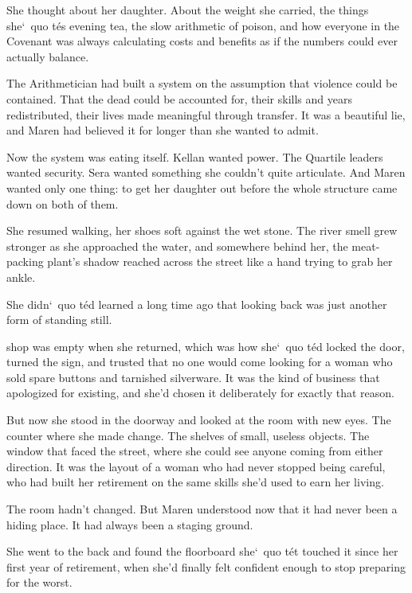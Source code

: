 \documentclass[12pt,letterpaper,openany]{book}
\begin{document}
\par
She thought about her daughter. About the weight she carried, the things she`\ quo t\'e{}s evening tea, the slow arithmetic of poison, and how everyone in the Covenant was always calculating costs and benefits as if the numbers could ever actually balance.
\par
The Arithmetician had built a system on the assumption that violence could be contained. That the dead could be accounted for, their skills and years redistributed, their lives made meaningful through transfer. It was a beautiful lie, and Maren had believed it for longer than she wanted to admit.
\par
Now the system was eating itself. Kellan wanted power. The Quartile leaders wanted security. Sera wanted something she couldn't quite articulate. And Maren wanted only one thing: to get her daughter out before the whole structure came down on both of them.
\par
She resumed walking, her shoes soft against the wet stone. The river smell grew stronger as she approached the water, and somewhere behind her, the meat-packing plant's shadow reached across the street like a hand trying to grab her ankle.
\par
She didn`\ quo t\'e{}d learned a long time ago that looking back was just another form of standing still.
\par
\hrulefillThe shop was empty when she returned, which was how she`\ quo t\'e{}d locked the door, turned the sign, and trusted that no one would come looking for a woman who sold spare buttons and tarnished silverware. It was the kind of business that apologized for existing, and she'd chosen it deliberately for exactly that reason.
\par
But now she stood in the doorway and looked at the room with new eyes. The counter where she made change. The shelves of small, useless objects. The window that faced the street, where she could see anyone coming from either direction. It was the layout of a woman who had never stopped being careful, who had built her retirement on the same skills she'd used to earn her living.
\par
The room hadn't changed. But Maren understood now that it had never been a hiding place. It had always been a staging ground.
\par
She went to the back and found the floorboard she`\ quo t\'e{}t touched it since her first year of retirement, when she'd finally felt confident enough to stop preparing for the worst.
\par
\end{document}
